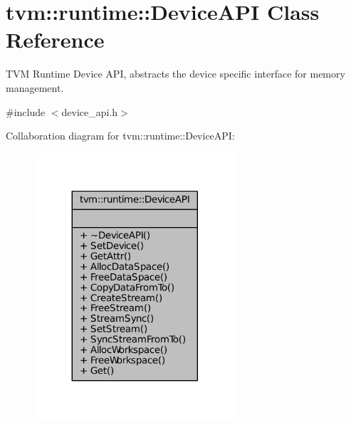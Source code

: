\hypertarget{classtvm_1_1runtime_1_1DeviceAPI}{}\section{tvm\+:\+:runtime\+:\+:Device\+A\+PI Class Reference}
\label{classtvm_1_1runtime_1_1DeviceAPI}


T\+VM Runtime Device A\+PI, abstracts the device specific interface for memory management.  




{\ttfamily \#include $<$device\+\_\+api.\+h$>$}



Collaboration diagram for tvm\+:\+:runtime\+:\+:Device\+A\+PI\+:
\nopagebreak
\begin{figure}[H]
\begin{center}
\leavevmode
\includegraphics[width=212pt]{classtvm_1_1runtime_1_1DeviceAPI__coll__graph}
\end{center}
\end{figure}
